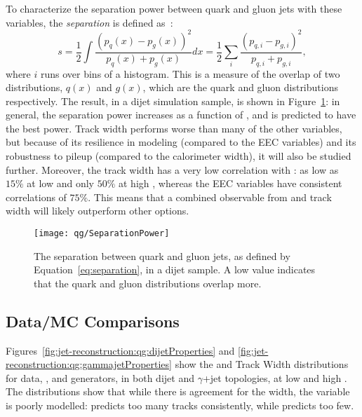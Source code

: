 To characterize the separation power between quark and gluon jets with these variables, the \textit{separation} is defined as~\cite{2006physics11219P}:
%
\begin{equation}
s=\frac{1}{2}\int\frac{(p_q(x)-p_g(x))^2}{p_q(x)+p_g(x)}dx = \frac{1}{2}\sum_i\frac{(p_{q,i}-p_{g,i})^2}{p_{q,i}+p_{g,i}}, 
\label{eq:separation}
\end{equation}
%
where $i$ runs over bins of a histogram. This is a measure of the overlap of two distributions, $q(x)$ and $g(x)$, which are the quark and gluon distributions respectively.  The result, in a \Pythia dijet simulation sample, is shown in Figure~\ref{fig:jet-reconstruction:qg:separation}: in general, the separation power increases as a function of \pt, and \ntrk is predicted to have the best power. Track width performs worse than many of the other variables, but because of its resilience in modeling (compared to the EEC variables) and its robustness to pileup (compared to the calorimeter width), it will also be studied further. Moreover, the track width has a very low correlation with \ntrk: as low as $15\%$ at low \pt and only $50\%$ at high \pt, whereas the EEC variables have consistent correlations of $75\%$. This means that a combined observable from \ntrk and track width will likely outperform other options.


\begin{figure}
\centering
\texttt{[image: qg/SeparationPower]}
\caption{The separation between quark and gluon jets, as defined by Equation~\ref{eq:separation}, in a \Pythia dijet sample. A low value indicates that the quark and gluon distributions overlap more.}
\label{fig:jet-reconstruction:qg:separation}
\end{figure}


\subsection{Data/MC Comparisons}


Figures~\ref{fig:jet-reconstruction:qg:dijetProperties} and \ref{fig:jet-reconstruction:qg:gammajetProperties} show the \ntrk and Track Width distributions for data, \Pythia, and \Herwigpp generators, in both dijet and $\gamma$+jet topologies, at low \pt and high \pt. The distributions show that while there is agreement for the width, the \ntrk variable is poorly modelled: \Pythia predicts too many tracks consistently, while \Herwigpp predicts too few. 

